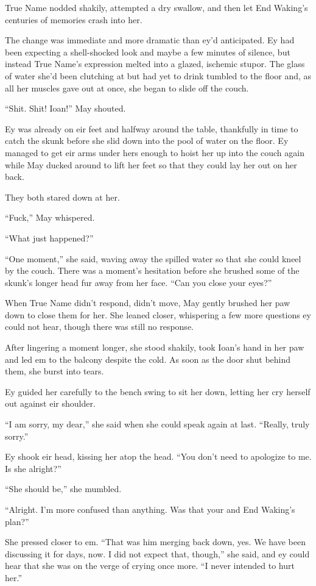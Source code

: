True Name nodded shakily, attempted a dry swallow, and then let End Waking's centuries of memories crash into her.

The change was immediate and more dramatic than ey'd anticipated. Ey had been expecting a shell-shocked look and maybe a few minutes of silence, but instead True Name's expression melted into a glazed, ischemic stupor. The glass of water she'd been clutching at but had yet to drink tumbled to the floor and, as all her muscles gave out at once, she began to slide off the couch.

``Shit. Shit! Ioan!'' May shouted.

Ey was already on eir feet and halfway around the table, thankfully in time to catch the skunk before she slid down into the pool of water on the floor. Ey managed to get eir arms under hers enough to hoist her up into the couch again while May ducked around to lift her feet so that they could lay her out on her back.

They both stared down at her.

``Fuck,'' May whispered.

``What just happened?''

``One moment,'' she said, waving away the spilled water so that she could kneel by the couch. There was a moment's hesitation before she brushed some of the skunk's longer head fur away from her face. ``Can you close your eyes?''

When True Name didn't respond, didn't move, May gently brushed her paw down to close them for her. She leaned closer, whispering a few more questions ey could not hear, though there was still no response.

After lingering a moment longer, she stood shakily, took Ioan's hand in her paw and led em to the balcony despite the cold. As soon as the door shut behind them, she burst into tears.

Ey guided her carefully to the bench swing to sit her down, letting her cry herself out against eir shoulder.

``I am sorry, my dear,'' she said when she could speak again at last. ``Really, truly sorry.''

Ey shook eir head, kissing her atop the head. ``You don't need to apologize to me. Is she alright?''

``She should be,'' she mumbled.

``Alright. I'm more confused than anything. Was that your and End Waking's plan?''

She pressed closer to em. ``That was him merging back down, yes. We have been discussing it for days, now. I did not expect that, though,'' she said, and ey could hear that she was on the verge of crying once more. ``I never intended to hurt her.''

